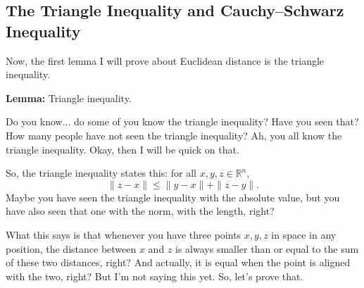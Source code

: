 \begin{ai-global-state-checkpoint-invisible-content}
\end{ai-global-state-checkpoint-invisible-content}

\subsection{The Triangle Inequality and Cauchy--Schwarz Inequality}

\begin{spoken-clean}[00:50:59 - 00:53:34]
Now, the first lemma I will prove about Euclidean distance is the triangle inequality.

\textbf{Lemma:} Triangle inequality.

Do you know... do some of you know the triangle inequality? Have you seen that? How many people have not seen the triangle inequality? Ah, you all know the triangle inequality. Okay, then I will be quick on that.

So, the triangle inequality states this: for all $x, y, z \in \mathbb{R}^n$,
\[
\|z - x\| \le \|y - x\| + \|z - y\|.
\]
Maybe you have seen the triangle inequality with the absolute value, but you have also seen that one with the norm, with the length, right?

What this says is that whenever you have three points $x, y, z$ in space in any position, the distance between $x$ and $z$ is always smaller than or equal to the sum of these two distances, right? And actually, it is equal when the point is aligned with the two, right? But I'm not saying this yet. So, let's prove that.
\end{spoken-clean}

